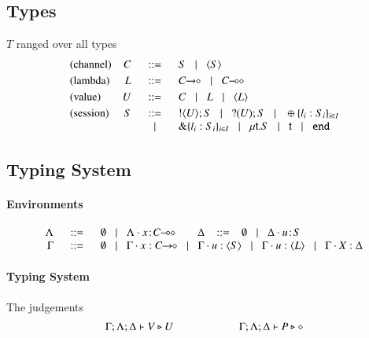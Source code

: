 \subsection{Types}
\label{subsec:types}
$T$ ranged over all types 
\label{subsec:types}
\[
\begin{array}{lrcl}
\text{(channel)}	& C & \bnfis &	S \bnfbar \chtype{S}
	\\[1mm]

\text{(lambda)} &	L & \bnfis &	\shot{C} \bnfbar \lhot{C}
	\\[1mm]

\text{(value)}	& U & \bnfis &	C \bnfbar L \bnfbar \chtype{L} %
	\\[1mm]

\text{(session)} &	  S & \bnfis & 	\btout{U} S \bnfbar \btinp{U} S 
\bnfbar \btsel{l_i:S_i}_{i \in I} \\ 
& & \bnfbar & \btbra{l_i:S_i}_{i \in I}
	  \bnfbar  \trec{t}{S} \bnfbar \vart{t}  \bnfbar \tinact
\end{array}
\]

\subsection{Typing System}
\label{subsec:typing}
\paragraph{Environments}
\[
\begin{array}{rcl}
 \Lambda & \bnfis & \emptyset \bnfbar \Lambda \cat \AT{x}{\lhot{C}}
\quad\quad \Delta  \ \bnfis  \ \emptyset \bnfbar \Delta \cat \AT{u}{S} \\
 \Gamma & \bnfis & \emptyset \bnfbar \Gamma \cat \varp{x}: \shot{C} \bnfbar \Gamma \cat u: \chtype{S} \bnfbar \Gamma \cat u: \chtype{L} 
        \bnfbar \Gamma \cat \rvar{X}: \Delta
\end{array}
\]

\paragraph{Typing System}
The judgements 
\[	\begin{array}{c}
	\Gamma; \Lambda; \Delta \vdash V \triangleright U \qquad \qquad \qquad \Gamma; \Lambda; \Delta \vdash P \triangleright \diamond
	\end{array}
\]

